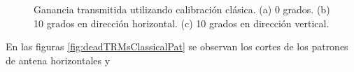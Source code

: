 \begin{figure}[H]
	\centering
 	
		\caption{Ganancia transmitida utilizando calibración clásica. (a) 0 grados. (b) 10 grados en 
		dirección horizontal. (c) 10 grados en dirección vertical.}
	\label{fig:deadTRMsClassical}
\end{figure}
En las figuras \ref{fig:deadTRMsClassicalPat} se observan los cortes de los patrones de antena horizontales y 

